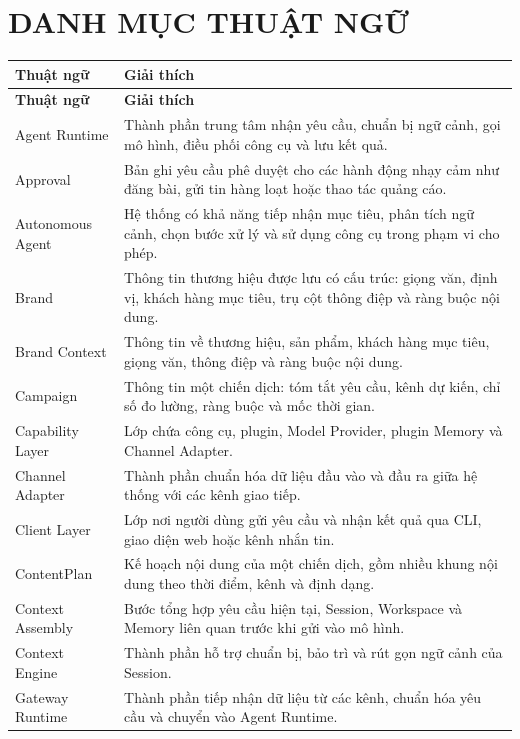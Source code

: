 \documentclass[a4paper]{article}
\newcounter{chapnum}
\renewcommand{\theHtable}{\arabic{chapnum}.\arabic{table}}
\begin{document}
\clearpage
\section*{DANH MỤC THUẬT NGỮ}
\begingroup
\renewcommand{\theHtable}{frontterms}
\begin{longtable}{L{0.30\textwidth}L{0.60\textwidth}}
\toprule
\textbf{Thuật ngữ} & \textbf{Giải thích}\\
\midrule
\endfirsthead
\toprule
\textbf{Thuật ngữ} & \textbf{Giải thích}\\
\midrule
\endhead
Agent Runtime & Thành phần trung tâm nhận yêu cầu, chuẩn bị ngữ cảnh, gọi mô hình, điều phối công cụ và lưu kết quả.\\
Approval & Bản ghi yêu cầu phê duyệt cho các hành động nhạy cảm như đăng bài, gửi tin hàng loạt hoặc thao tác quảng cáo.\\
Autonomous Agent & Hệ thống có khả năng tiếp nhận mục tiêu, phân tích ngữ cảnh, chọn bước xử lý và sử dụng công cụ trong phạm vi cho phép.\\
Brand & Thông tin thương hiệu được lưu có cấu trúc: giọng văn, định vị, khách hàng mục tiêu, trụ cột thông điệp và ràng buộc nội dung.\\
Brand Context & Thông tin về thương hiệu, sản phẩm, khách hàng mục tiêu, giọng văn, thông điệp và ràng buộc nội dung.\\
Campaign & Thông tin một chiến dịch: tóm tắt yêu cầu, kênh dự kiến, chỉ số đo lường, ràng buộc và mốc thời gian.\\
Capability Layer & Lớp chứa công cụ, plugin, Model Provider, plugin Memory và Channel Adapter.\\
Channel Adapter & Thành phần chuẩn hóa dữ liệu đầu vào và đầu ra giữa hệ thống với các kênh giao tiếp.\\
Client Layer & Lớp nơi người dùng gửi yêu cầu và nhận kết quả qua CLI, giao diện web hoặc kênh nhắn tin.\\
ContentPlan & Kế hoạch nội dung của một chiến dịch, gồm nhiều khung nội dung theo thời điểm, kênh và định dạng.\\
Context Assembly & Bước tổng hợp yêu cầu hiện tại, Session, Workspace và Memory liên quan trước khi gửi vào mô hình.\\
Context Engine & Thành phần hỗ trợ chuẩn bị, bảo trì và rút gọn ngữ cảnh của Session.\\
Gateway Runtime & Thành phần tiếp nhận dữ liệu từ các kênh, chuẩn hóa yêu cầu và chuyển vào Agent Runtime.\\

\end{longtable}
\end{document}

